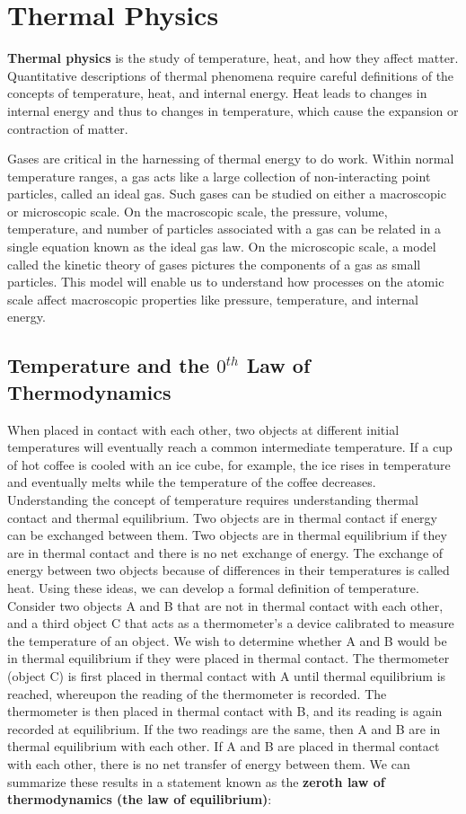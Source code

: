 \section{Thermal Physics}

\textbf{Thermal physics} is the study of temperature, heat, and how they affect matter. Quantitative descriptions of thermal phenomena require careful definitions of the concepts of temperature, heat, and internal energy. Heat leads to changes in internal energy and thus to changes in temperature, which cause the expansion or contraction of matter.

Gases are critical in the harnessing of thermal energy to do work. Within normal temperature ranges, a gas acts like a large collection of non-interacting point particles, called an ideal gas. Such gases can be studied on either a macroscopic or microscopic scale. On the macroscopic scale, the pressure, volume, temperature, and number of particles associated with a gas can be related in a single equation known as the ideal gas law. On the microscopic scale, a model called the kinetic theory of gases pictures the components of a gas as small particles. This model will enable us to understand how processes on the atomic scale affect macroscopic properties like pressure, temperature, and internal energy.

\subsection{Temperature and the $0^{th}$ Law of Thermodynamics}

When placed in contact with each other, two objects at different initial temperatures will eventually reach a common intermediate temperature. If a cup of hot coffee is cooled with an ice cube, for example, the ice rises in temperature and eventually melts while the temperature of the coffee decreases. Understanding the concept of temperature requires understanding thermal contact and thermal equilibrium. Two objects are in thermal contact if energy can be 
exchanged between them. Two  objects are in thermal equilibrium if they are in thermal contact and there is no net exchange of energy. The exchange of energy between two objects because of differences in their temperatures is called heat. Using these ideas, we can develop a formal definition of temperature. Consider two objects A and B that are not in thermal contact with each other, and a third object C that acts as a thermometer's a device calibrated to measure the temperature of an object. We wish to determine whether A and B would be in thermal equilibrium if they were placed in thermal contact. The thermometer (object C) is first placed in thermal contact with A until thermal equilibrium is reached, whereupon the reading of the thermometer is recorded. The thermometer is then placed in thermal contact with B, and its reading is again recorded at equilibrium. If the two readings are the same, then A and B are in thermal equilibrium with each other. If A and B are placed in thermal contact with each other, there is no net transfer of energy between them. We can summarize these results in a statement known as the\textbf{ zeroth law of thermodynamics (the law of equilibrium)}:

